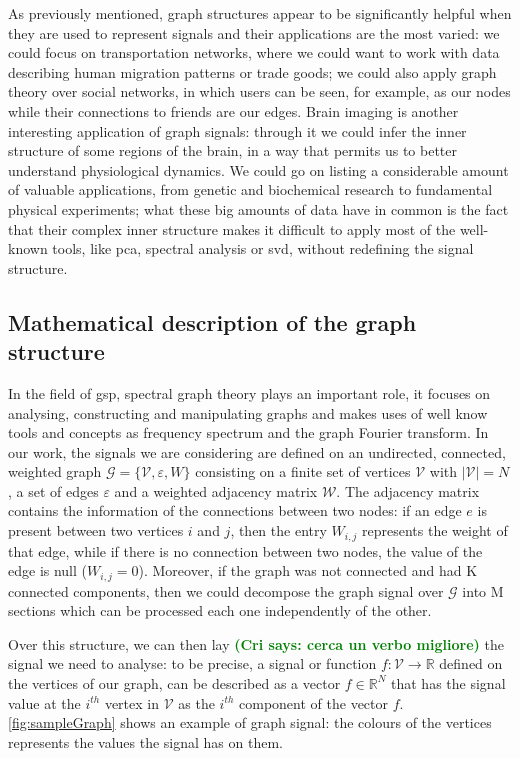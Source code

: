 \documentclass[11pt,a4paper,titlepage]{article}
\newcommand{\R}{\mathbb{R}}
\newcommand{\cri}[1]{\textcolor{green}{\textbf{(Cri says: #1)}}}
\begin{document}
As previously mentioned, graph structures appear to be significantly helpful when they are used to represent signals and their applications are the most varied: we could focus on transportation networks, where we could want to work with data describing human migration patterns or trade goods; we could also apply graph theory over social networks, in which users can be seen, for example, as our nodes while their connections to friends are our edges. \cite{Ortega2017} Brain imaging is another interesting application of graph signals: through it we could infer the inner structure of some regions of the brain, in a way that permits us to better understand physiological dynamics.  \cite{Shuman2013} We could go on listing a considerable amount of valuable applications, from genetic and biochemical research to fundamental physical experiments; what these big amounts of data have in common is the fact that their complex inner structure makes it difficult to apply most of the well-known tools, like \gls{pca}, spectral analysis or \gls{svd}, without redefining the signal structure. \cite{Sandry}

\subsection{Mathematical description of the graph structure}
In the field of \gls{gsp}, spectral graph theory plays an important role, it focuses on analysing, constructing and manipulating graphs and makes uses of well know tools and concepts as frequency spectrum and the graph Fourier transform. In our work, the signals we are considering are defined on an undirected, connected, weighted graph $\mathcal{G} = \{ \mathcal{V}, \varepsilon, W\}$ consisting on a finite set of vertices $\mathcal{V}$ with $|\mathcal{V}| = N$, a set of edges $\varepsilon$ and a weighted adjacency matrix $\mathcal{W}$. The adjacency matrix contains the information of the connections between two nodes: if an edge $e$ is present between two vertices $i$ and $j$, then the entry $W_{i,j}$ represents the weight of that edge, while if there is no connection between two nodes, the value of the edge is null ($W_{i,j} = 0$). Moreover, if the graph was not connected and had K connected components, then we could decompose the graph signal over $\mathcal{G}$ into M sections which can be processed each one independently of the other.

Over this structure, we can then lay \cri{cerca un verbo migliore} the signal we need to analyse: to be precise, a signal or function $f: \mathcal{V} \to \R$ defined on the vertices of our graph, can be described as a vector $f \in \R^N$ that has the signal value at the $i^{th}$ vertex in $\mathcal{V}$ as the $i^{th}$ component of the vector $f$. \autoref{fig:sampleGraph} shows an example of graph signal: the colours of the vertices represents the values the signal has on them.
\end{document}
